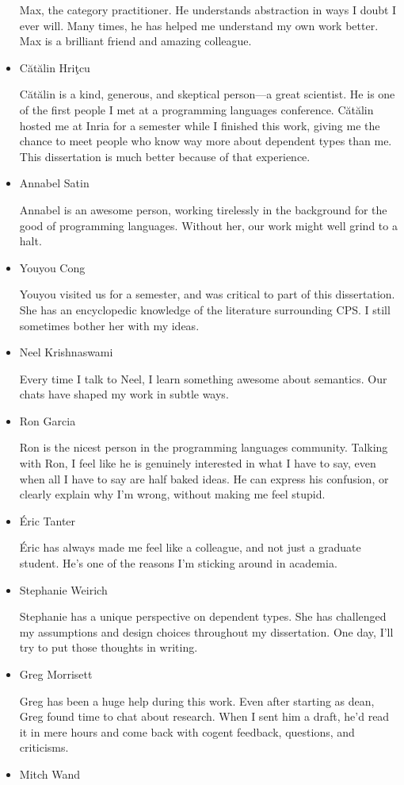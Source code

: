 \begin{itemize}
  Max, the category practitioner.
  He understands abstraction in ways I doubt I ever will.
  Many times, he has helped me understand my own work better.
  Max is a brilliant friend and amazing colleague.
\item Cătălin Hriţcu

  Cătălin is a kind, generous, and skeptical person---a great scientist.
  He is one of the first people I met at a programming languages conference.
  Cătălin hosted me at Inria for a semester while I finished this work, giving
  me the chance to meet people who know way more about dependent types than me.
  This dissertation is much better because of that experience.
\item Annabel Satin

  Annabel is an awesome person, working tirelessly in the background for the
  good of programming languages.
  Without her, our work might well grind to a halt.
\item Youyou Cong

  Youyou visited us for a semester, and was critical to part of this
  dissertation.
  She has an encyclopedic knowledge of the literature surrounding CPS.
  I still sometimes bother her with my ideas.
\item Neel Krishnaswami

  Every time I talk to Neel, I learn something awesome about semantics.
  Our chats have shaped my work in subtle ways.
\item Ron Garcia

  Ron is the nicest person in the programming languages community.
  Talking with Ron, I feel like he is genuinely interested in what I have to
  say, even when all I have to say are half baked ideas.
  He can express his confusion, or clearly explain why I'm wrong, without
  making me feel stupid.
\item Éric Tanter

  Éric has always made me feel like a colleague, and not just a graduate student.
  He's one of the reasons I'm sticking around in academia.
\item Stephanie Weirich

  Stephanie has a unique perspective on dependent types.
  She has challenged my assumptions and design choices throughout my
  dissertation.
  One day, I'll try to put those thoughts in writing.
\item Greg Morrisett

  Greg has been a huge help during this work.
  Even after starting as dean, Greg found time to chat about research.
  When I sent him a draft, he'd read it in mere hours and come back with cogent
  feedback, questions, and criticisms.
\item Mitch Wand


\end{itemize}
